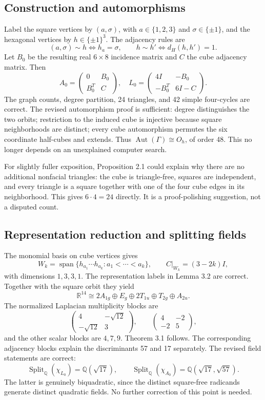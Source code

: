 \documentclass[11pt,a4paper]{article}
\newcommand{\Q}{\mathbb Q}\newcommand{\C}{\mathbb C}\newcommand{\R}{\mathbb R}
\begin{document}
\subsection{Construction and automorphisms}
Label the square vertices by $(a,\sigma)$, with $a\in\{1,2,3\}$ and $\sigma\in\{\pm1\}$, and the hexagonal vertices by $h\in\{\pm1\}^3$. The adjacency rules are
\[
 (a,\sigma)\sim h\iff h_a=\sigma,\qquad
 h\sim h'\iff d_H(h,h')=1.
\]
Let $B_0$ be the resulting real $6\times8$ incidence matrix and $C$ the cube adjacency matrix. Then
\[
 A_0=\begin{pmatrix}0&B_0\\B_0^T&C\end{pmatrix},\quad
 L_0=\begin{pmatrix}4I&-B_0\\-B_0^T&6I-C\end{pmatrix}.
\]
The graph counts, degree partition, 24 triangles, and 42 simple four-cycles are correct. The revised automorphism proof is sufficient: degree distinguishes the two orbits; restriction to the induced cube is injective because square neighborhoods are distinct; every cube automorphism permutes the six coordinate half-cubes and extends. Thus $\operatorname{Aut}(\Gamma)\cong O_h$, of order 48. This no longer depends on an unexplained computer search.

For slightly fuller exposition, Proposition 2.1 could explain why there are no additional nonfacial triangles: the cube is triangle-free, squares are independent, and every triangle is a square together with one of the four cube edges in its neighborhood. This gives $6\cdot4=24$ directly. It is a proof-polishing suggestion, not a disputed count.

\subsection{Representation reduction and splitting fields}
The monomial basis on cube vertices gives
\[
 W_k=\operatorname{span}\{h_{a_1}\cdots h_{a_k}:a_1<\cdots<a_k\},
 \qquad C|_{W_k}=(3-2k)I,
\]
with dimensions $1,3,3,1$. The representation labels in Lemma 3.2 are correct. Together with the square orbit they yield
\[
 \R^{14}\cong2A_{1g}\oplus E_g\oplus2T_{1u}\oplus T_{2g}\oplus A_{2u}.
\]
The normalized Laplacian multiplicity blocks are
\[
 \begin{pmatrix}4&-\sqrt{12}\\-\sqrt{12}&3\end{pmatrix},\qquad
 \begin{pmatrix}4&-2\\-2&5\end{pmatrix},
\]
and the other scalar blocks are $4,7,9$. Theorem 3.1 follows. The corresponding adjacency blocks explain the discriminants 57 and 17 separately. The revised field statements are correct:
\[
 \operatorname{Split}_{\Q}(\chi_{L_0})=\Q(\sqrt{17}),\qquad
 \operatorname{Split}_{\Q}(\chi_{A_0})=\Q(\sqrt{17},\sqrt{57}).
\]
The latter is genuinely biquadratic, since the distinct square-free radicands generate distinct quadratic fields. No further correction of this point is needed.
\end{document}
